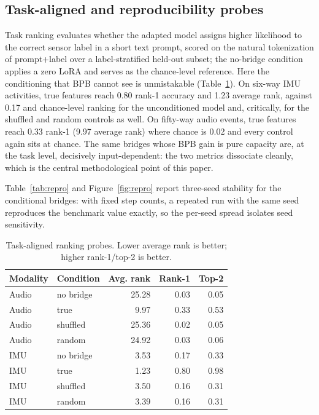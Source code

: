 \documentclass[11pt]{article}
\begin{document}
\subsection{Task-aligned and reproducibility probes}
Task ranking evaluates whether the adapted model assigns higher likelihood to the correct sensor label in a short text prompt, scored on the natural tokenization of prompt+label over a label-stratified held-out subset; the no-bridge condition applies a zero LoRA and serves as the chance-level reference. Here the conditioning that BPB cannot see is unmistakable (Table~\ref{tab:task}). On six-way IMU activities, true features reach 0.80 rank-1 accuracy and 1.23 average rank, against 0.17 and chance-level ranking for the unconditioned model and, critically, for the shuffled and random controls as well. On fifty-way audio events, true features reach 0.33 rank-1 (9.97 average rank) where chance is 0.02 and every control again sits at chance. The same bridges whose BPB gain is pure capacity are, at the task level, decisively input-dependent: the two metrics dissociate cleanly, which is the central methodological point of this paper.

Table~\ref{tab:repro} and Figure~\ref{fig:repro} report three-seed stability for the conditional bridges: with fixed step counts, a repeated run with the same seed reproduces the benchmark value exactly, so the per-seed spread isolates seed sensitivity.

\begin{table}[t]
\centering
\caption{Task-aligned ranking probes. Lower average rank is better; higher rank-1/top-2 is better.}
\label{tab:task}
\begin{tabular}{llrrr}
\toprule
Modality & Condition & Avg. rank & Rank-1 & Top-2 \\
\midrule
Audio & no bridge & 25.28 & 0.03 & 0.05 \\
Audio & true & 9.97 & 0.33 & 0.53 \\
Audio & shuffled & 25.36 & 0.02 & 0.05 \\
Audio & random & 24.92 & 0.03 & 0.06 \\
IMU & no bridge & 3.53 & 0.17 & 0.33 \\
IMU & true & 1.23 & 0.80 & 0.98 \\
IMU & shuffled & 3.50 & 0.16 & 0.31 \\
IMU & random & 3.39 & 0.16 & 0.31 \\
\bottomrule
\end{tabular}
\end{table}
\end{document}
